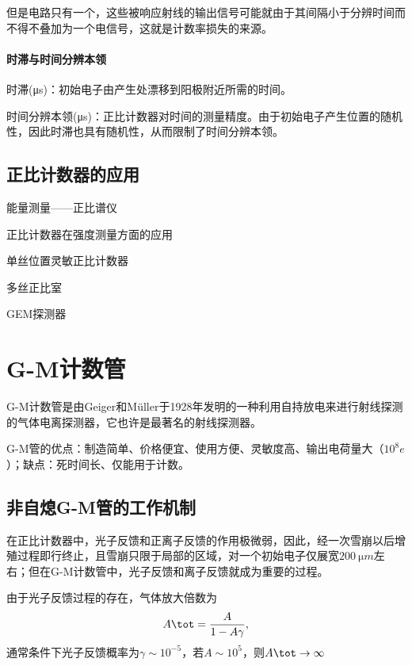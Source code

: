 但是电路只有一个，这些被响应射线的输出信号可能就由于其间隔小于分辨时间而不得不叠加为一个电信号，这就是计数率损失的来源。
\paragraph{时滞与时间分辨本领}
时滞(\si{\micro s})：初始电子由产生处漂移到阳极附近所需的时间。

时间分辨本领(\si{\micro s})：正比计数器对时间的测量精度。由于初始电子产生位置的随机性，因此时滞也具有随机性，从而限制了时间分辨本领。

\subsection{正比计数器的应用}

能量测量——正比谱仪

正比计数器在强度测量方面的应用

单丝位置灵敏正比计数器

多丝正比室

GEM探测器

\section{G-M计数管}

G-M计数管是由Geiger和Müller于1928年发明的一种利用自持放电来进行射线探测的气体电离探测器，它也许是最著名的射线探测器。

G-M管的优点：制造简单、价格便宜、使用方便、灵敏度高、输出电荷量大（$10^8e$）；缺点：死时间长、仅能用于计数。

\subsection{非自熄G-M管的工作机制}

在正比计数器中，光子反馈和正离子反馈的作用极微弱，因此，经一次雪崩以后增殖过程即行终止，且雪崩只限于局部的区域，对一个初始电子仅展宽$\SI{200}{\micro m}$左右；但在G-M计数管中，光子反馈和离子反馈就成为重要的过程。

由于光子反馈过程的存在，气体放大倍数为
\[
	A\tot=\frac A{1-A\gamma},
\]
通常条件下光子反馈概率为$\gamma\sim 10^{-5}$，若$A\sim 10^5$，则$A\tot\to\infty$

